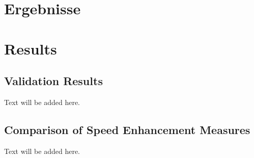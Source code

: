 {\chapter{Ergebnisse}}
{\chapter{Results}}

\label{sec:results}

\section{Validation Results}
Text will be added here.

\section{Comparison of Speed Enhancement Measures}
Text will be added here.

